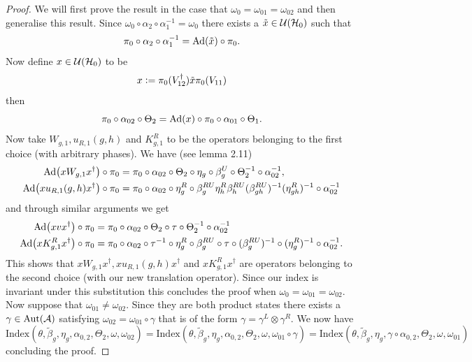 \documentclass[12pt,a4paper,twoside]{article}
\numberwithin{equation}{section}
\begin{document}
\begin{proof}
	We will first prove the result in the case that $\omega_0=\omega_{01}=\omega_{02}$ and then generalise this result. Since $\omega_0\circ\alpha_2\circ\alpha_1^{-1}=\omega_0$ there exists a $\tilde{x}\in\mathcal U(\mathcal H_0)$ such that
	\begin{equation}
		\pi_0\circ\alpha_2\circ\alpha_1^{-1}=\Ad{\tilde{x}}\circ\pi_0.
	\end{equation}
	Now define $x\in\mathcal U(\mathcal H_0)$ to be
	\begin{equation}
		x\vcentcolon= \pi_0(V_{12}^\dagger)\tilde{x} \pi_0(V_{11})
	\end{equation}
	then
	\begin{equation}
		\pi_0\circ\alpha_{02}\circ\Theta_2=\Ad{x}\circ\pi_0\circ\alpha_{01}\circ\Theta_1.
	\end{equation}
	Now take $W_{g,1},u_{R,1}(g,h)$ and $K^R_{g,1}$ to be the operators belonging to the first choice (with arbitrary phases). 
	We have (see \cite{ogata2021h3gmathbb} lemma 2.11)
	\begin{align}
		\Ad{xW_{g,1}x^\dagger}\circ\pi_0&=\pi_0\circ \alpha_{02}\circ\Theta_2\circ\eta_g\circ\beta_g^U\circ\Theta_2^{-1}\circ\alpha_{02}^{-1},\\
		\Ad{xu_{R,1}(g,h)x^\dagger}\circ\pi_0&=\pi_0\circ \alpha_{02}\circ\eta_g^R\circ\beta_g^{RU}\eta_h^R\beta_{h}^{RU}(\beta_{gh}^{RU})^{-1}(\eta_{gh}^R)^{-1}\circ\alpha_{02}^{-1}
	\end{align}
	and through similar arguments we get
	\begin{align}
		\Ad{xvx^\dagger}\circ\pi_0&=\pi_0\circ\alpha_{02}\circ\Theta_2\circ\tau\circ\Theta_2^{-1}\circ\alpha_{02}^{-1}\\
		\Ad{xK^R_{g,1}x^\dagger}\circ\pi_0&=\pi_0\circ \alpha_{02}\circ\tau^{-1}\circ\eta_g^R\circ\beta_g^{RU}\circ\tau\circ(\beta_g^{RU})^{-1}\circ(\eta^R_g)^{-1}\circ\alpha_{02}^{-1}.
	\end{align}
	This shows that $xW_{g,1}x^\dagger,xu_{R,1}(g,h)x^\dagger$ and $xK^R_{g,1}x^\dagger$ are operators belonging to the second choice (with our new translation operator). Since our index is invariant under this substitution this concludes the proof when $\omega_0=\omega_{01}=\omega_{02}$. Now suppose that $\omega_{01}\neq\omega_{02}$. Since they are both product states there exists a $\gamma\in\Aut{\AA}$ satisfying $\omega_{02}=\omega_{01}\circ\gamma$ that is of the form $\gamma=\gamma^L\otimes\gamma^R$. We now have
	\begin{equation}
		\textrm{Index}(\theta,\tilde{\beta}_g,\eta_g,\alpha_{0,2},\Theta_2,\omega,\omega_{02})=\textrm{Index}(\theta,\tilde{\beta}_g,\eta_g,\alpha_{0,2},\Theta_2,\omega,\omega_{01}\circ\gamma)=\textrm{Index}(\theta,\tilde{\beta}_g,\eta_g,\gamma\circ\alpha_{0,2},\Theta_2,\omega,\omega_{01})
	\end{equation}
	concluding the proof.
\end{proof}
\end{document}
